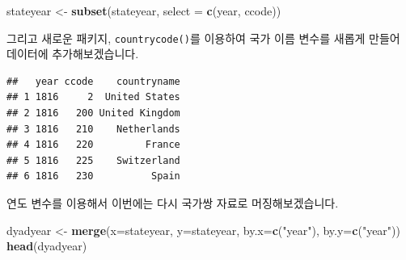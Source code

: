 \documentclass[]{book}
\newenvironment{Shaded}{\begin{snugshade}}{\end{snugshade}}
\newcommand{\CommentTok}[1]{\textcolor[rgb]{0.56,0.35,0.01}{\textit{#1}}}
\newcommand{\DataTypeTok}[1]{\textcolor[rgb]{0.13,0.29,0.53}{#1}}
\newcommand{\KeywordTok}[1]{\textcolor[rgb]{0.13,0.29,0.53}{\textbf{#1}}}
\newcommand{\NormalTok}[1]{#1}
\newcommand{\OperatorTok}[1]{\textcolor[rgb]{0.81,0.36,0.00}{\textbf{#1}}}
\newcommand{\StringTok}[1]{\textcolor[rgb]{0.31,0.60,0.02}{#1}}
\begin{document}
\begin{Shaded}
\begin{Highlighting}[]
\NormalTok{stateyear <-}\StringTok{ }\KeywordTok{subset}\NormalTok{(stateyear, }\DataTypeTok{select =} \KeywordTok{c}\NormalTok{(year, ccode))}
\end{Highlighting}
\end{Shaded}

그리고 새로운 패키지, \texttt{countrycode()}를 이용하여 국가 이름 변수를 새롭게 만들어 데이터에 추가해보겠습니다.

\begin{Shaded}
\end{Shaded}

\begin{verbatim}
##   year ccode    countryname
## 1 1816     2  United States
## 2 1816   200 United Kingdom
## 3 1816   210    Netherlands
## 4 1816   220         France
## 5 1816   225    Switzerland
## 6 1816   230          Spain
\end{verbatim}

연도 변수를 이용해서 이번에는 다시 국가쌍 자료로 머징해보겠습니다.

\begin{Shaded}
\begin{Highlighting}[]
\NormalTok{dyadyear <-}\StringTok{ }\KeywordTok{merge}\NormalTok{(}\DataTypeTok{x=}\NormalTok{stateyear, }\DataTypeTok{y=}\NormalTok{stateyear, }\DataTypeTok{by.x=}\KeywordTok{c}\NormalTok{(}\StringTok{"year"}\NormalTok{), }\DataTypeTok{by.y=}\KeywordTok{c}\NormalTok{(}\StringTok{"year"}\NormalTok{))}
\KeywordTok{head}\NormalTok{(dyadyear)}
\end{Highlighting}
\end{Shaded}
\end{document}
